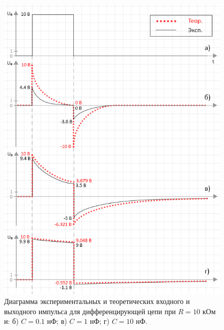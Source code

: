 \begin{figure}[H]
	\begin{center}
		\includegraphics[width=14cm]{img/diff_with_theory2}
		\caption{Диаграмма экспериментальных и теоретических входного и выходного импульса для дифференцирующей цепи при $R = 10$ кОм и: б) $C = 0.1$ нФ; в) $C = 1$ нФ; г) $C = 10$ нФ.} 
		\label{d:1} %
	\end{center}
\end{figure}

